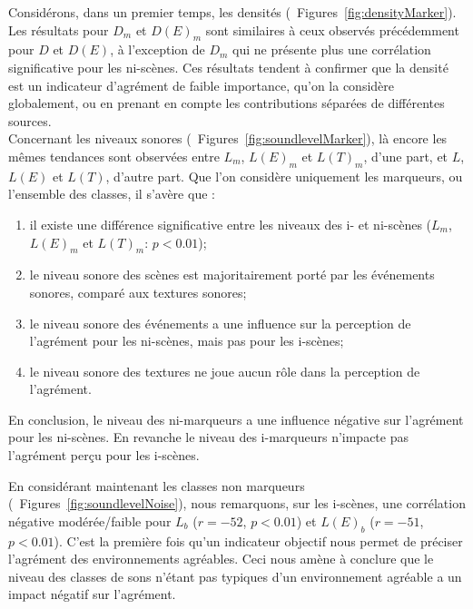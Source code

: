 Considérons, dans un premier temps, les densités (\cf~Figures~\ref{fig:densityMarker}). Les résultats pour $D_m$ et $D(E)_m$ sont similaires à ceux observés précédemment pour $D$ et $D(E)$, à l'exception de $D_m$ qui ne présente plus une corrélation significative pour les ni-scènes. Ces résultats tendent à confirmer que la densité est un indicateur d'agrément de faible importance, qu'on la considère globalement, ou en prenant en compte les contributions séparées de différentes sources. \\


Concernant les niveaux sonores (\cf~Figures~\ref{fig:soundlevelMarker}), là encore les mêmes tendances sont observées entre $L_m$, $L(E)_m$ et $L(T)_m$, d'une part, et $L$, $L(E)$ et $L(T)$, d'autre part. Que l'on considère uniquement les marqueurs, ou l'ensemble des classes, il s'avère que :

\begin{enumerate}
\item il existe une différence significative entre les niveaux des i- et ni-scènes ($L_m$, $L(E)_m$ et $L(T)_m$: $p<0.01$);
\item le niveau sonore des scènes est majoritairement porté par les événements sonores, comparé aux textures sonores;
\item le niveau sonore des événements a une influence sur la perception de l'agrément pour les ni-scènes, mais pas pour les i-scènes;
\item le niveau sonore des textures ne joue aucun rôle dans la perception de l'agrément.
\end{enumerate}

En conclusion, le niveau des ni-marqueurs a une influence négative sur l'agrément pour les ni-scènes. En revanche le niveau des i-marqueurs n’impacte pas l'agrément perçu pour les i-scènes.

En considérant maintenant les classes non marqueurs (\cf~Figures~\ref{fig:soundlevelNoise}), nous remarquons, sur les i-scènes, une corrélation négative modérée/faible pour $L_b$  ($r=-52$, $p<0.01$) et $L(E)_b$ ($r=-51$, $p<0.01$). C'est la première fois qu'un indicateur objectif nous permet de préciser l'agrément des environnements agréables. Ceci nous amène à conclure que le niveau des classes de sons n'étant pas typiques d'un environnement agréable a un impact négatif sur l'agrément. 

